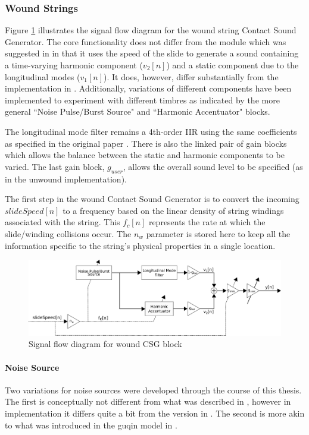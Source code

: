 \documentclass[../main.tex]{subfiles}
\begin{document}
\subsubsection{Wound Strings}
Figure \ref{fig:CSG_wound} illustrates the signal flow diagram for the wound string Contact Sound Generator. The core functionality does not differ from the module which was suggested in  in that it uses the speed of the slide to generate a sound containing a time-varying harmonic component ($v_2[n]$) and a static component due to the longitudinal modes ($v_1[n]$). It does, however,  differ substantially from the implementation in . Additionally, variations of different components have been implemented to experiment with different timbres as indicated by the more general ``Noise Pulse/Burst Source" and ``Harmonic Accentuator" blocks.

The longitudinal mode filter remains a 4th-order IIR using the same coefficients as specified in the original paper . There is also the linked pair of gain blocks which allows the balance between the static and harmonic components to be varied. The last gain block, $g_{user}$, allows the overall sound level to be specified (as in the unwound implementation).

The first step in the wound Contact Sound Generator is to convert the incoming $slideSpeed[n]$ to a frequency based on the linear density of string windings associated with the string. This $f_c[n]$ represents the rate at which the slide/winding collisions occur. The $n_w$ parameter is stored here to keep all the information specific to the string's physical properties in a single location.

\begin{figure}[h]
    \centering
    \includegraphics[scale=.5]{./images/diagrams/CSG_wound.png}
    \caption{Signal flow diagram for wound CSG block}
    \label{fig:CSG_wound}
\end{figure}

\paragraph{Noise Source}
Two variations for noise sources were developed through the course of this thesis. The first is conceptually not different from what was described in , however in implementation it differs quite a bit from the version in . The second is more akin to what was introduced in  the guqin model in .
\end{document}
